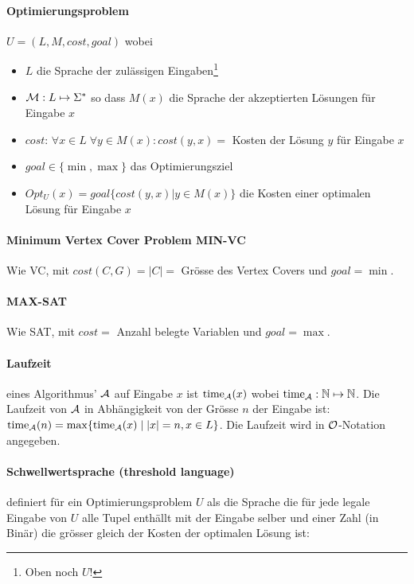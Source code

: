 \paragraph{Optimierungsproblem}
$U = (L, M, cost, goal)$ wobei
\begin{itemize}
    \item $L$ die Sprache der zulässigen Eingaben\footnote{Oben noch $U$!}
    \item $\mathcal{M}: L \mapsto \Sigma^*$ so dass $M(x)$ die Sprache der akzeptierten Lösungen für Eingabe $x$
    \item $cost$: $\forall x \in L \; \forall y \in M(x) : cost(y, x) = $ Kosten der Lösung $y$ für Eingabe $x$
    \item $goal \in \{ \min, \max \}$ das Optimierungsziel
    \item $Opt_U(x) = goal \{ cost(y, x) | y \in M(x) \}$ die Kosten einer optimalen Lösung für Eingabe $x$
\end{itemize}

\paragraph{Minimum Vertex Cover Problem MIN-VC}
Wie VC, mit $cost(C, G) = |C| = $ Grösse des Vertex Covers und $goal = \min$.

\paragraph{MAX-SAT}
Wie SAT, mit $cost = $ Anzahl belegte Variablen und $goal = \max$.

\paragraph{Laufzeit}
eines Algorithmus' $\mathcal{A}$ auf Eingabe $x$ ist $\text{time}_{\mathcal{A}} (x)$
wobei $\text{time}_{\mathcal{A}}: \mathbb{N} \mapsto \mathbb{N}$.
Die Laufzeit von $\mathcal{A}$ in Abhängigkeit von der Grösse $n$ der Eingabe ist:
$\text{time}_{\mathcal{A}} (n) = \max \{ \text{time}_{\mathcal{A}} (x) \; | \; |x| = n, x \in L \}$.
Die Laufzeit wird in  $\mathcal{O}$-Notation angegeben.

\paragraph{Schwellwertsprache (threshold language)} definiert für ein Optimierungsproblem $U$ als die Sprache die für jede legale Eingabe von $U$ alle Tupel enthällt mit der Eingabe selber und einer Zahl (in Binär) die grösser gleich der Kosten der optimalen Lösung ist:

